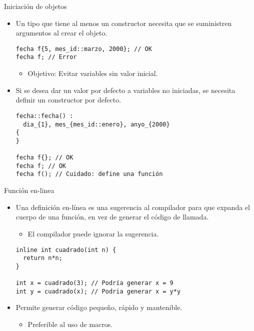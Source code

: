 \begin{frame}[fragile]{Iniciación de objetos}
\begin{itemize}
  \item Un tipo que tiene al menos un constructor necesita que se suministren
        argumentos al crear el objeto.
\begin{lstlisting}
fecha f{5, mes_id::marzo, 2000}; // OK
fecha f; // Error
\end{lstlisting}
    \begin{itemize}
      \item Objetivo: Evitar variables sin valor inicial.
    \end{itemize}
  \item Si se desea dar un valor por defecto a variables no iniciadas, se
        necesita definir un constructor por defecto.
\begin{lstlisting}
fecha::fecha() :
  dia_{1}, mes_{mes_id::enero}, anyo_{2000}
{
}

fecha f{}; // OK
fecha f; // OK
fecha f(); // Cuidado: define una función
\end{lstlisting}
\end{itemize}
\end{frame}

\begin{frame}[fragile]{Función en-linea}
\begin{itemize}
  \item Una definición \alert{en-línea} es una sugerencia al compilador para que expanda
        el cuerpo de una función, en vez de generar el código de llamada.
    \begin{itemize}
      \item El compilador puede ignorar la sugerencia.
    \end{itemize}
\begin{lstlisting}
inline int cuadrado(int n) { 
  return n*n; 
}

int x = cuadrado(3); // Podría generar x = 9
int y = cuadrado(x); // Podria generar x = y*y
\end{lstlisting}
  \item Permite generar código pequeño, rápido y mantenible.
    \begin{itemize}
      \item Preferible al uso de macros.
    \end{itemize}
\end{itemize}
\end{frame}

